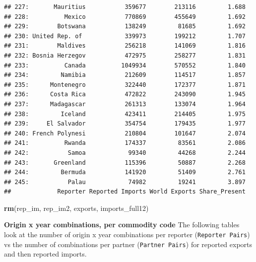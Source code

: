 \documentclass[10pt,]{article}
\newenvironment{Shaded}{\begin{snugshade}}{\end{snugshade}}
\newcommand{\KeywordTok}[1]{\textcolor[rgb]{0.13,0.29,0.53}{\textbf{{#1}}}}
\newcommand{\NormalTok}[1]{{#1}}
\begin{document}
\begin{verbatim}
## 227:       Mauritius           359677        213116         1.688
## 228:          Mexico           770869        455649         1.692
## 229:        Botswana           138249         81685         1.692
## 230: United Rep. of            339973        199212         1.707
## 231:        Maldives           256218        141069         1.816
## 232: Bosnia Herzegov           472975        258277         1.831
## 233:          Canada          1049934        570552         1.840
## 234:         Namibia           212609        114517         1.857
## 235:      Montenegro           322440        172377         1.871
## 236:      Costa Rica           472822        243090         1.945
## 237:      Madagascar           261313        133074         1.964
## 238:         Iceland           423411        214405         1.975
## 239:     El Salvador           354754        179435         1.977
## 240: French Polynesi           210804        101647         2.074
## 241:          Rwanda           174337         83561         2.086
## 242:           Samoa            99340         44268         2.244
## 243:       Greenland           115396         50887         2.268
## 244:         Bermuda           141920         51409         2.761
## 245:           Palau            74982         19241         3.897
##             Reporter Reported Imports World Exports Share_Present
\end{verbatim}

\begin{Shaded}
\begin{Highlighting}[]
\KeywordTok{rm}\NormalTok{(rep_im, rep_im2, exports, imports_full12)}
\end{Highlighting}
\end{Shaded}

\textbf{Origin x year combinations, per commodity code} The following
tables look at the number of origin x year combinations per reporter
(\texttt{Reporter\ Pairs}) vs the number of combinations per partner
(\texttt{Partner\ Pairs}) for reported exports and then reported
imports.
\end{document}
